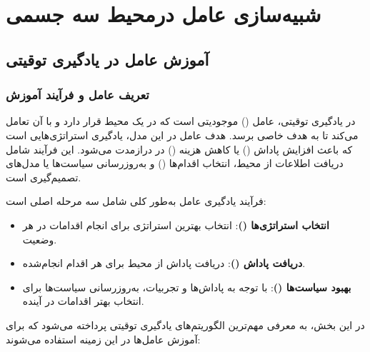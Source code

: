 \chapter{شبیه‌سازی عامل درمحیط سه جسمی}


\section{آموزش عامل در یادگیری توقیتی}

\subsection{تعریف عامل و فرآیند آموزش}
در یادگیری توقیتی، عامل () موجودیتی است که در یک محیط قرار دارد و با آن تعامل می‌کند تا به هدف خاصی برسد. هدف عامل در این مدل، یادگیری استراتژی‌هایی است که باعث افزایش پاداش () یا کاهش هزینه () در درازمدت می‌شود. این فرآیند شامل دریافت اطلاعات از محیط، انتخاب اقدام‌ها () و به‌روزرسانی سیاست‌ها یا مدل‌های تصمیم‌گیری است.

فرآیند یادگیری عامل به‌طور کلی شامل سه مرحله اصلی است:
\begin{itemize}
	\item \textbf{انتخاب استراتژی‌ها ()}: انتخاب بهترین استراتژی برای انجام اقدامات در هر وضعیت.
	\item \textbf{دریافت پاداش ()}: دریافت پاداش از محیط برای هر اقدام انجام‌شده.
	\item \textbf{بهبود سیاست‌ها ()}: با توجه به پاداش‌ها و تجربیات، به‌روزرسانی سیاست‌ها برای انتخاب بهتر اقدامات در آینده.
\end{itemize}

در این بخش، به معرفی مهم‌ترین الگوریتم‌های یادگیری توقیتی پرداخته می‌شود که برای آموزش عامل‌ها در این زمینه استفاده می‌شوند:


